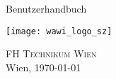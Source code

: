 %
%

\begin{titlepage}
\begin{center}
\vspace*{40mm} \huge Benutzerhandbuch\\
\vspace*{10mm} 

\vfill \texttt{[image: wawi\_logo\_sz]}
	
\large \vfill \textsc{FH Technikum Wien}\\

Wien, \today
\end{center}
\end{titlepage}